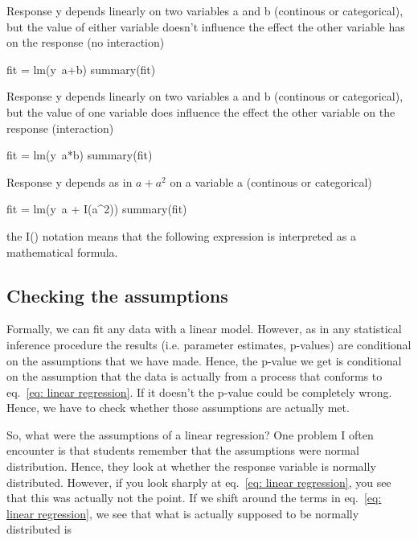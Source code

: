 \documentclass[a4paper,twoside]{tufte-book}\usepackage[]{graphicx}\usepackage[]{color}
\begin{document}
{\begin{fullwidth}
\begin{mdframed}
Response y depends linearly on two variables a and b (continous or categorical), but the value of either variable doesn't influence the effect the other variable has on the response (no interaction)

\begin{Schunk}
\begin{Sinput}
fit = lm(y~a+b)
summary(fit)
\end{Sinput}
\end{Schunk}

Response y depends linearly on two variables a and b (continous or categorical), but the value of one variable does influence the effect the other variable on the response (interaction)

\begin{Schunk}
\begin{Sinput}
fit = lm(y~a*b)
summary(fit)
\end{Sinput}
\end{Schunk}

Response y depends as in $a + a^2$ on a variable a (continous or categorical)

\begin{Schunk}
\begin{Sinput}
fit = lm(y~a + I(a^2))
summary(fit)
\end{Sinput}
\end{Schunk}

the I() notation means that the following expression is interpreted as a mathematical formula. 

\end{mdframed}
\end{fullwidth}


\subsection{Checking the assumptions}

Formally, we can fit any data with a linear model. However, as in any statistical inference procedure the results (i.e. parameter estimates, p-values) are conditional on the assumptions that we have made. Hence, the p-value we get is conditional on the assumption that the data is actually from a process that conforms to eq.~\ref{eq: linear regression}. If it doesn't the p-value could be completely wrong. Hence, we have to check whether those assumptions are actually met. 

So, what were the assumptions of a linear regression? One problem I often encounter is that students remember that the assumptions were normal distribution. Hence, they look at whether the response variable is normally distributed. However, if you look sharply at eq.~\ref{eq: linear regression}, you see that this was actually not the point. If we shift around the terms in eq.~\ref{eq: linear regression}, we see that what is actually supposed to be normally distributed is 

}
\end{document}
